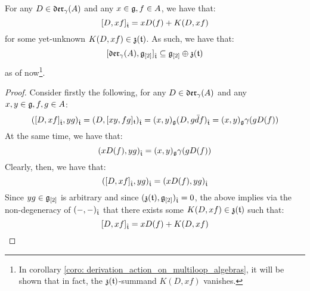         \begin{lemma} \label{lemma: derivation_action_on_multiloop_algebras}
            For any $D \in \mathfrak{der}_{\gamma}(A)$ and any $x \in \mathfrak{g}, f \in A$, we have that:
                $$[D, xf]_{\hat{\mathfrak{t}}} = x D(f) + K( D, xf )$$
            for some yet-unknown $K( D, xf ) \in \mathfrak{z}(\mathfrak{t})$. As such, we have that:
                $$[\mathfrak{der}_{\gamma}(A), \mathfrak{g}_{[2]}]_{\hat{\mathfrak{t}}} \subseteq \mathfrak{g}_{[2]} \oplus \mathfrak{z}(\mathfrak{t})$$
            as of now\footnote{In corollary \ref{coro: derivation_action_on_multiloop_algebras}, it will be shown that in fact, the $\mathfrak{z}(\mathfrak{t})$-summand $K( D, xf )$ vanishes.}.
        \end{lemma}
            \begin{proof}
                Consider firstly the following, for any $D \in \mathfrak{der}_{\gamma}(A)$ and any $x, y \in \mathfrak{g}, f, g \in A$:
                    $$( [D, xf]_{\hat{\mathfrak{t}}}, yg )_{\hat{\mathfrak{t}}} = ( D, [xy, fg]_{\mathfrak{t}} )_{\hat{\mathfrak{t}}} = (x, y)_{\mathfrak{g}} ( D, g\bar{d}f )_{\hat{\mathfrak{t}}} = (x, y)_{\mathfrak{g}} \gamma( g D(f) )$$
                At the same time, we have that:
                    $$( x D(f), yg )_{\hat{\mathfrak{t}}} = (x, y)_{\mathfrak{g}} \gamma( g D(f) )$$
                Clearly, then, we have that:
                    $$( [D, xf]_{\hat{\mathfrak{t}}}, yg )_{\hat{\mathfrak{t}}} = ( x D(f), yg )_{\hat{\mathfrak{t}}}$$
                Since $yg \in \mathfrak{g}_{[2]}$ is arbitrary and since $(\mathfrak{z}(\mathfrak{t}), \mathfrak{g}_{[2]})_{\hat{\mathfrak{t}}} = 0$, the above implies via the non-degeneracy of $(-, -)_{\hat{\mathfrak{t}}}$ that there exists some $K(D, xf) \in \mathfrak{z}(\mathfrak{t})$ such that:
                    $$[D, xf]_{\hat{\mathfrak{t}}} = x D(f) + K(D, xf)$$
            \end{proof}
    
